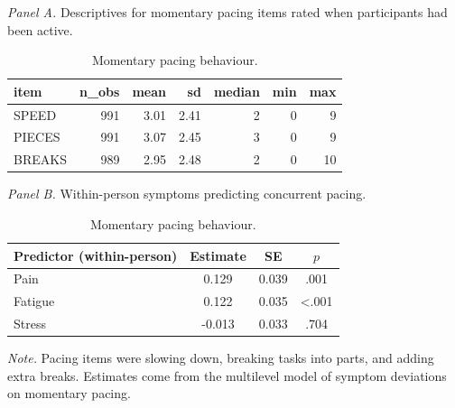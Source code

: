 \begin{table}[H]
\raggedright
\caption{Momentary pacing behaviour.}
\label{tab:sup-pacing}
\footnotesize
\begingroup
\setlength{\tabcolsep}{4pt}
\renewcommand{\arraystretch}{1.08}
\noindent\textit{Panel A.} Descriptives for momentary pacing items rated when participants had been active.\par\vspace{2pt}
\begin{tabular*}{\textwidth}{@{\extracolsep{\fill}}lrrrrrr@{}}
\toprule
item & n\_obs & mean & sd & median & min & max \\
\midrule
SPEED & 991 & 3.01 & 2.41 & 2 & 0 & 9 \\
PIECES & 991 & 3.07 & 2.45 & 3 & 0 & 9 \\
BREAKS & 989 & 2.95 & 2.48 & 2 & 0 & 10 \\
\bottomrule
\end{tabular*}
\par\vspace{6pt}\noindent\textit{Panel B.} Within-person symptoms predicting concurrent pacing.\par\vspace{2pt}
\begin{tabular*}{\textwidth}{@{\extracolsep{\fill}}lccc@{}}
\toprule
Predictor (within-person) & Estimate & SE & $p$ \\
\midrule
Pain & 0.129 & 0.039 & .001 \\
Fatigue & 0.122 & 0.035 & <.001 \\
Stress & -0.013 & 0.033 & .704 \\
\bottomrule
\end{tabular*}
\par\vspace{3pt}\noindent\parbox{\textwidth}{\footnotesize\textit{Note.} Pacing items were slowing down, breaking tasks into parts, and adding extra breaks. Estimates come from the multilevel model of symptom deviations on momentary pacing.}
\endgroup
\end{table}
